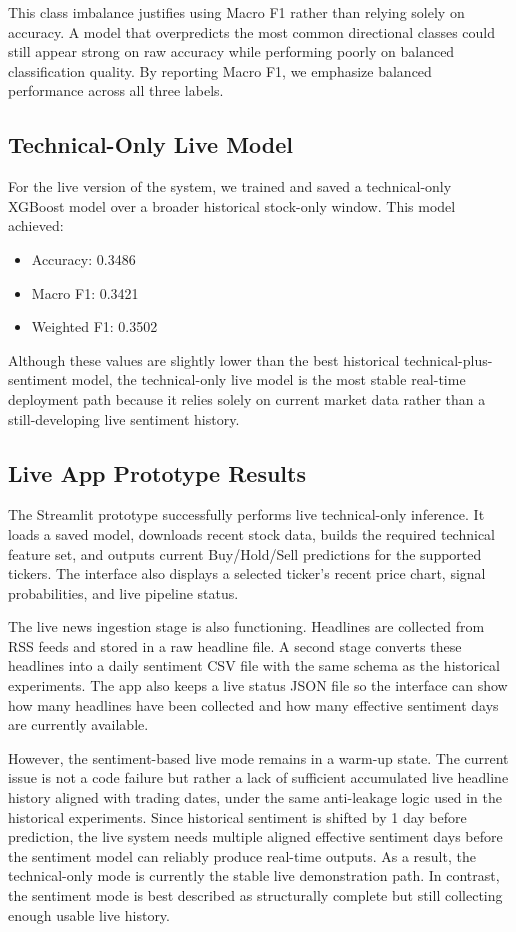 \documentclass[11pt]{article}
\begin{document}
This class imbalance justifies using Macro F1 rather than relying solely on accuracy. A model that overpredicts the most common directional classes could still appear strong on raw accuracy while performing poorly on balanced classification quality. By reporting Macro F1, we emphasize balanced performance across all three labels.

\subsection{Technical-Only Live Model}

For the live version of the system, we trained and saved a technical-only XGBoost model over a broader historical stock-only window. This model achieved:
\begin{itemize}
    \item Accuracy: 0.3486
    \item Macro F1: 0.3421
    \item Weighted F1: 0.3502
\end{itemize}

Although these values are slightly lower than the best historical technical-plus-sentiment model, the technical-only live model is the most stable real-time deployment path because it relies solely on current market data rather than a still-developing live sentiment history.

\subsection{Live App Prototype Results}

The Streamlit prototype successfully performs live technical-only inference. It loads a saved model, downloads recent stock data, builds the required technical feature set, and outputs current Buy/Hold/Sell predictions for the supported tickers. The interface also displays a selected ticker's recent price chart, signal probabilities, and live pipeline status.

The live news ingestion stage is also functioning. Headlines are collected from RSS feeds and stored in a raw headline file. A second stage converts these headlines into a daily sentiment CSV file with the same schema as the historical experiments. The app also keeps a live status JSON file so the interface can show how many headlines have been collected and how many effective sentiment days are currently available.

However, the sentiment-based live mode remains in a warm-up state. The current issue is not a code failure but rather a lack of sufficient accumulated live headline history aligned with trading dates, under the same anti-leakage logic used in the historical experiments. Since historical sentiment is shifted by 1 day before prediction, the live system needs multiple aligned effective sentiment days before the sentiment model can reliably produce real-time outputs. As a result, the technical-only mode is currently the stable live demonstration path. In contrast, the sentiment mode is best described as structurally complete but still collecting enough usable live history.
\end{document}
